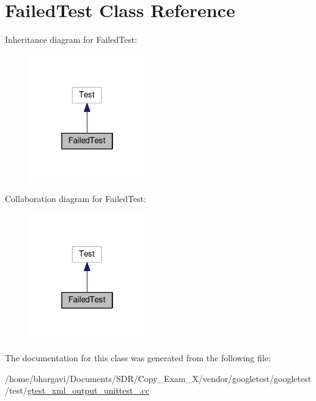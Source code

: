 \hypertarget{class_failed_test}{}\section{Failed\+Test Class Reference}
\label{class_failed_test}


Inheritance diagram for Failed\+Test\+:
\nopagebreak
\begin{figure}[H]
\begin{center}
\leavevmode
\includegraphics[width=142pt]{class_failed_test__inherit__graph}
\end{center}
\end{figure}


Collaboration diagram for Failed\+Test\+:
\nopagebreak
\begin{figure}[H]
\begin{center}
\leavevmode
\includegraphics[width=142pt]{class_failed_test__coll__graph}
\end{center}
\end{figure}


The documentation for this class was generated from the following file\+:\begin{DoxyCompactItemize}
\item 
/home/bhargavi/\+Documents/\+S\+D\+R/\+Copy\+\_\+\+Exam\+\_\+X/vendor/googletest/googletest/test/\hyperlink{gtest__xml__output__unittest___8cc}{gtest\+\_\+xml\+\_\+output\+\_\+unittest\+\_\+.\+cc}\end{DoxyCompactItemize}
